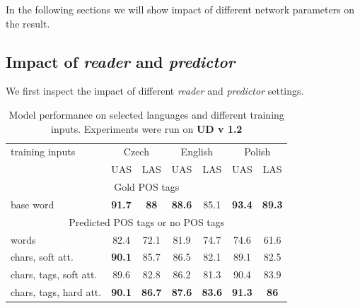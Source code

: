 In the following sections we will show impact of different network parameters
on the result.

\subsection{Impact of \emph{reader} and \emph{predictor}}
We first inspect the impact of different \emph{reader} and \emph{predictor}
settings.
\begin{table}[!htbp]
  \centering
  \label{tab:results}
  \begin{tabular}{l|cc|cc|cc|}
    training inputs & \multicolumn{2}{c|}{Czech} & \multicolumn{2}{c|}{English} & \multicolumn{2}{c|}{Polish} \\
    & UAS & LAS & UAS & LAS & UAS & LAS \\ 
    \multicolumn{7}{c}{Gold POS tags} \\  \hline
    base word & 
    \textbf{91.7} & \textbf{88} & 
    \textbf{88.6} & 85.1 & 
    \textbf{93.4} & \textbf{89.3} \\
    \multicolumn{7}{c}{Predicted POS tags or no POS tags} \\ \hline
    words & 
    82.4 & 72.1 &
    81.9 & 74.7 & 
    74.6 & 61.6  \\
    chars, soft att. & 
    \textbf{90.1} & 85.7 & %
    86.5 & 82.1 & %
    89.1 & 82.5 \\ %
    chars, tags, soft att. & 
    89.6 & 82.8 & %
    86.2 & 81.3 & %
    90.4 & 83.9 \\ %
    chars, tags, hard att. & 
    \textbf{90.1} & \textbf{86.7} & %
    \textbf{87.6} & \textbf{83.6} & %
    \textbf{91.3} & \textbf{86} \\ %
  \end{tabular}
  \caption{Model performance on selected languages and different training inputs. Experiments were run on \textbf{UD v 1.2}} 
\end{table}

